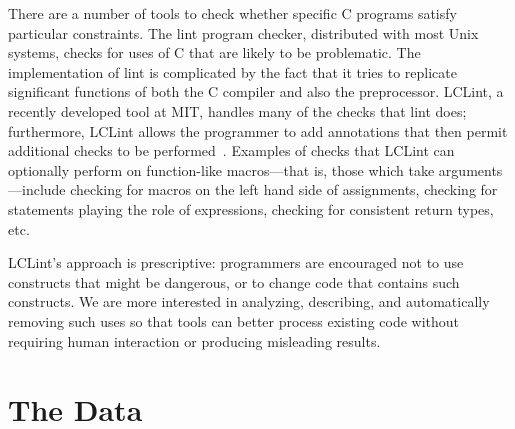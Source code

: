 There are a number of tools to check whether specific C programs
satisfy particular constraints.  The lint program checker, distributed
with most Unix systems, checks for uses of C that are likely to be
problematic.  The implementation of lint is complicated by the fact
that it tries to replicate significant functions of both the C
compiler and also the preprocessor.  LCLint, a recently developed tool
at MIT, handles many of the checks that lint does; furthermore, LCLint
allows the programmer to add annotations that then permit additional
checks to be performed~\cite{Evans-fse94}\cite{Evans-pldi96}.
Examples of checks that LCLint can optionally perform on function-like
macros---that is, those which take arguments---include checking for
macros on the left hand side of assignments, checking for statements
playing the role of expressions, checking for consistent return types, etc.

LCLint's approach is prescriptive: programmers are encouraged not to use
constructs that might be dangerous, or to change code that contains such
constructs.  We are more interested in analyzing, describing, and
automatically removing such uses so that tools can better process existing
code without requiring human interaction or producing misleading results.


\section{The Data}\label{sec:gathering}

